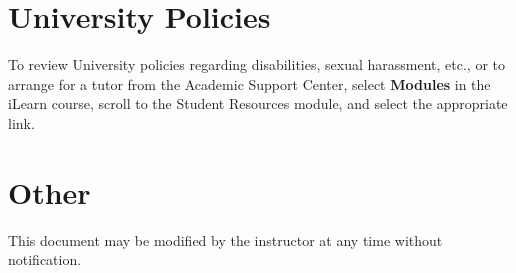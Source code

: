 \documentclass[12pt]{amsart}
\begin{document}
\section{University Policies}
To review University policies regarding disabilities, sexual harassment, etc., or to arrange for a tutor from the Academic Support Center, select \textbf{Modules} in the iLearn course, scroll to the Student Resources module, and select the appropriate link.

\section{Other}
This document may be modified by the instructor at any time without notification.
\end{document}

